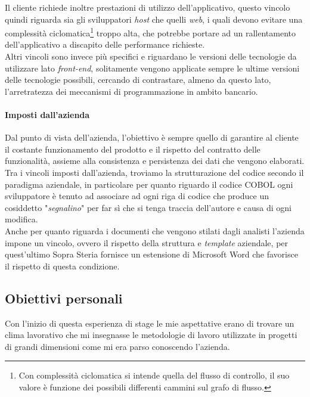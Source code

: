 	Il cliente richiede inoltre prestazioni di utilizzo dell'applicativo, questo vincolo quindi riguarda sia gli sviluppatori \textit{host} che quelli \textit{web}, i quali devono evitare una complessità ciclomatica\footnote{Con complessità ciclomatica si intende quella del flusso di controllo, il suo valore è funzione dei possibili differenti cammini sul grafo di flusso.} troppo alta, che potrebbe portare ad un rallentamento dell'applicativo a discapito delle performance richieste.\\

	Altri vincoli sono invece più specifici e riguardano le versioni delle tecnologie da utilizzare lato \textit{front-end}, solitamente vengono applicate sempre le ultime versioni delle tecnologie possibili, cercando di contrastare, almeno da questo lato, l'arretratezza dei meccanismi di programmazione in ambito bancario.

	\paragraph{Imposti dall'azienda}
	\leavevmode	\newline
	\leavevmode	\newline
	Dal punto di vista dell'azienda, l'obiettivo è sempre quello di garantire al cliente il costante funzionamento del prodotto e il rispetto del contratto delle funzionalità, assieme alla consistenza e persistenza dei dati che vengono elaborati.\\
	
	Tra i vincoli imposti dall'azienda, troviamo la strutturazione del codice secondo il paradigma aziendale, in particolare per quanto riguardo il codice COBOL ogni sviluppatore è tenuto ad associare ad ogni riga di codice che produce un cosiddetto "\textit{segnalino}" per far sì che si tenga traccia dell'autore e causa di ogni modifica.\\
	
	Anche per quanto riguarda i documenti che vengono stilati dagli analisti l'azienda impone un vincolo, ovvero il rispetto della struttura e \textit{template} aziendale, per quest'ultimo Sopra Steria fornisce un estensione di Microsoft Word che favorisce il rispetto di questa condizione.

\subsection{Obiettivi personali}
	Con l'inizio di questa esperienza di stage le mie aspettative erano di trovare un clima lavorativo che mi insegnasse le metodologie di lavoro utilizzate in progetti di grandi dimensioni come mi era parso conoscendo l'azienda.\\

